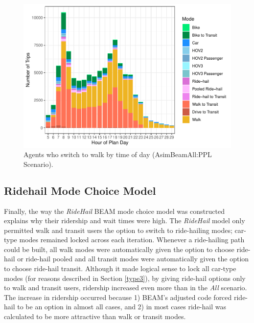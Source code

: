 \documentclass[fancy, masters]{byuthesis}
\begin{document}
\begin{figure}

{\centering \includegraphics{thesis_files/figure-latex/walkers-1} 

}

\caption[Agents who switch to walk by time of day.]{Agents who switch to walk by time of day (AsimBeamAll:PPL Scenario).}\label{fig:walkers}
\end{figure}

\hypertarget{type2}{%
\subsection{Ridehail Mode Choice Model}\label{type2}}

Finally, the way the \emph{RideHail} BEAM mode choice model was constructed explains why their ridership and wait times were high. The \emph{RideHail} model only permitted walk and transit users the option to switch to ride-hailing modes; car-type modes remained locked across each iteration. Whenever a ride-hailing path could be built, all walk modes were automatically given the option to choose ride-hail or ride-hail pooled and all transit modes were automatically given the option to choose ride-hail transit. Although it made logical sense to lock all car-type modes (for reasons described in Section \ref{type3}), by giving ride-hail options only to walk and transit users, ridership increased even more than in the \emph{All} scenario. The increase in ridership occurred because 1) BEAM's adjusted code forced ride-hail to be an option in almost all cases, and 2) in most cases ride-hail was calculated to be more attractive than walk or transit modes.
\end{document}

